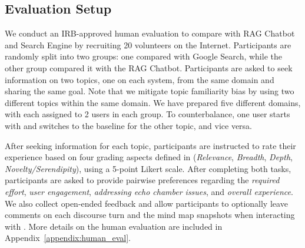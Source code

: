 \documentclass[11pt]{article}
\begin{document}
\subsection{Evaluation Setup}
We conduct an IRB-approved human evaluation to compare \system with RAG Chatbot and Search Engine by recruiting 20 volunteers on the Internet. Participants are randomly split into two groups: one compared \system with Google Search, while the other group compared it with the RAG Chatbot. Participants are asked to seek information on two topics, one on each system, from the same domain and sharing the same goal. Note that we mitigate topic familiarity bias by using two different topics within the same domain.
We have prepared five different domains, with each assigned to 2 users in each group. To counterbalance, one user starts with \system and switches to the baseline for the other topic, and vice versa. 


After seeking information for each topic, participants are instructed to rate their experience based on four grading aspects defined in  (\textit{Relevance}, \textit{Breadth}, \textit{Depth}, \textit{Novelty/Serendipity}), using a 5-point Likert scale. After completing both tasks, participants are asked to provide pairwise preferences regarding the \textit{required effort}, \textit{user engagement}, \textit{addressing echo chamber issues}, and \textit{overall experience}. We also collect open-ended feedback and allow participants to optionally leave comments on each discourse turn and the mind map snapshots when interacting with \system. More details on the human evaluation are included in Appendix~\ref{appendix:human_eval}.
\end{document}
